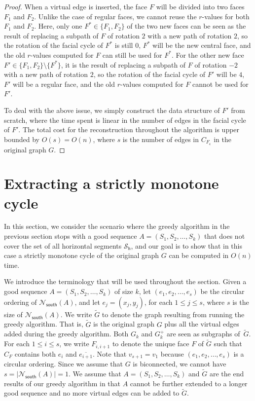 \documentclass{article}\usepackage[a4paper,margin=20mm]{geometry}
\newcommand{\FC}{F_\mathsf{c}}
\newcommand{\PH}{\mathcal{S}_\mathsf{h}}
\newcommand{\Nsouth}{\mathcal{N}_\mathsf{south}}
\begin{document}
\begin{proof}
 
 
 When a virtual edge is inserted, the face $F$ will be divided into two faces $F_1$ and $F_2$. Unlike the case of regular faces, we cannot reuse the $r$-values for both  $F_1$ and $F_2$. Here, only one $F^\ast \in \{F_1, F_2\}$ of the two new faces can be seen as the result of replacing a subpath of $F$ of rotation $2$ with a new path of rotation $2$, so the rotation of the facial cycle of $F^\ast$ is still $0$,  $F^\ast$ will be the new central face, and the old $r$-values computed for $F$ can still be used for $F^\ast$.
 For the other new face $F' \in \{F_1, F_2\} \setminus \{F^\ast\}$, it is the result of replacing a subpath of $F$ of rotation $-2$ with a new path of rotation $2$, so the rotation of the facial cycle of $F'$ will be $4$,  $F'$ will be a regular face, and the old $r$-values computed for $F$ cannot be used for $F'$. 
 
 To deal with the above issue, we simply construct the data structure of $F'$ from scratch, where the time spent is linear in the number of edges in the facial cycle of $F'$. The total cost for the reconstruction throughout the algorithm is upper bounded by $O(s)=O(n)$, where $s$ is the number of edges in $C_{\FC}$ in the original graph $G$.
\end{proof}


\section{Extracting a strictly monotone cycle}\label{sect:cycle}

In this section, we consider the scenario where the greedy algorithm in the previous section stops with a good sequence $A=(S_1, S_2, \ldots, S_k)$ that does not cover the set of all horizontal segments $\PH$, and our goal is to show that in this case a strictly monotone cycle of the original graph $G$ can be computed in $O(n)$ time.

We introduce the terminology that will be used throughout the section. Given a good sequence $A=(S_1, S_2, \ldots, S_k)$ of size $k$, let $(e_1, e_2, \ldots, e_s)$ be the circular ordering of $\Nsouth(A)$, and let $e_j=(x_j, y_j)$, for each $1 \leq j \leq s$, where $s$ is the size of $\Nsouth(A)$. We write $\tilde{G}$ to denote the graph resulting from running the greedy algorithm. That is, $\tilde{G}$ is the original graph $G$ plus all the virtual edges added during the greedy algorithm. Both $G_k$ and $G_k^+$ are seen as subgraphs of~$\tilde{G}$. For each $1 \leq i \leq s$, we write $F_{i, i+1}$ to denote the unique face $F$ of $\tilde{G}$ such that $C_F$ contains both  ${e_{i}}$ and $\overline{e_{i+1}}$. Note that  $v_{s+1}=v_1$ because $(e_1, e_2, \ldots, e_s)$ is a circular ordering. Since we assume that $G$ is biconnected, we cannot have $s= |\Nsouth(A)| = 1$.
We assume that $A=(S_1, S_2, \ldots, S_k)$ and $\tilde{G}$ are the end results of our greedy algorithm in that $A$ cannot be further extended to a longer good sequence and no more virtual edges can be added to $\tilde{G}$. 
\end{document}
